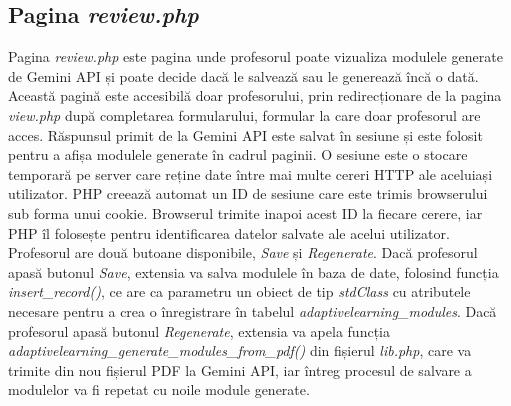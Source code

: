 \subsection{Pagina \textit{review.php}}
Pagina \textit{review.php} este pagina unde profesorul poate vizualiza modulele generate de Gemini API și poate decide dacă le salvează sau le generează încă o dată. Această pagină este
accesibilă doar profesorului, prin redirecționare de la pagina \textit{view.php} după completarea formularului, formular la care doar profesorul are acces. Răspunsul primit de la Gemini API 
este salvat în sesiune și este folosit pentru a afișa modulele generate în cadrul paginii. O sesiune este o stocare temporară pe server care reține date între mai multe cereri HTTP ale 
aceluiași utilizator. PHP creează automat un ID de sesiune care este trimis browserului sub forma unui cookie. Browserul trimite inapoi acest ID la fiecare cerere, iar PHP îl folosește 
pentru identificarea datelor salvate ale acelui utilizator. Profesorul are două butoane 
disponibile, \textit{Save} și \textit{Regenerate}. Dacă profesorul apasă butonul \textit{Save}, extensia va salva modulele în baza de date, folosind funcția \textit{insert\_record()}, ce 
are ca parametru un obiect de tip \textit{stdClass} cu atributele necesare pentru a crea o înregistrare în tabelul \textit{adaptivelearning\_modules}. Dacă profesorul apasă butonul 
\textit{Regenerate}, extensia va apela funcția \textit{adaptivelearning\_generate\_modules\_from\_pdf()} din fișierul \textit{lib.php}, care va trimite din nou fișierul PDF la Gemini API, 
iar întreg procesul de salvare a modulelor va fi repetat cu noile module generate.

